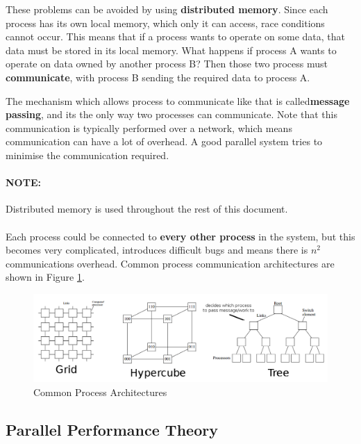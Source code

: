 \documentclass{article}
\begin{document}
These problems can be avoided by using \textbf{distributed memory}. Since each process has its own local memory, which only it can access, race conditions cannot occur. This means that if a process wants to operate on some data, that data must be stored in its local memory. What happens if process A wants to operate on data owned by another process B? Then those two process must \textbf{communicate}, with process B sending the required data to process A. 

The mechanism which allows process to communicate like that is called\textbf{message passing}, and its the only way two processes can communicate. Note that this communication is typically performed over a network, which means communication can have a lot of overhead.  A good parallel system tries to minimise the communication required.

\paragraph{\textbf{NOTE:}} Distributed memory is used throughout the rest of this document.

\paragraph{}

Each process could be connected to \textbf{every other process} in the system, but this becomes very complicated, introduces difficult bugs and means there is $n^2$ communications overhead. Common process communication architectures are shown in Figure \ref{fig:common-process-architectures}.

\begin{figure}
	\centering
	\includegraphics[scale=0.4]{figures/distributed-architectures.png}
	\caption{Common Process Architectures}
	\label{fig:common-process-architectures}
\end{figure}
	
\subsection{Parallel Performance Theory}
\end{document}
